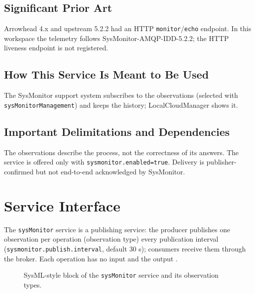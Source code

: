 \documentclass[a4paper]{arrowhead}
\newcommand{\mref}[2][]{{\textcolor{ArrowheadPurple}{\hyperref[sec:model:#2]{\ifstrempty{#1}{#2}{#1}}}}}
\begin{document}
\subsection{Significant Prior Art}

Arrowhead 4.x and upstream 5.2.2 had an HTTP \texttt{monitor}/\texttt{echo} endpoint. In this workspace the telemetry follows SysMonitor-AMQP-IDD-5.2.2; the HTTP liveness endpoint is not registered.

\subsection{How This Service Is Meant to Be Used}

The SysMonitor support system subscribes to the observations (selected with \texttt{sys\allowbreak{}Monitor\allowbreak{}Management}) and keeps the history; LocalCloudManager shows it.

\subsection{Important Delimitations and Dependencies}
\label{sec:delimitations}

The observations describe the process, not the correctness of its answers. The service is offered only with \texttt{sysmonitor.\allowbreak{}enabled=\allowbreak{}true}. Delivery is publisher-confirmed but not end-to-end acknowledged by SysMonitor.

\newpage

\section{Service Interface}
\label{sec:operations}

The \texttt{sysMonitor} service is a publishing service: the producer publishes one observation per operation (observation type) every publication interval (\texttt{sysmonitor.publish.interval}, default 30 s); consumers receive them through the broker. Each operation has no input and the output \mref{Observation}.

\begin{figure}[ht!]
  \centering
  \caption{SysML-style block of the \texttt{sysMonitor} service and its observation types.}
  \label{fig:SD}
\end{figure}
\end{document}
